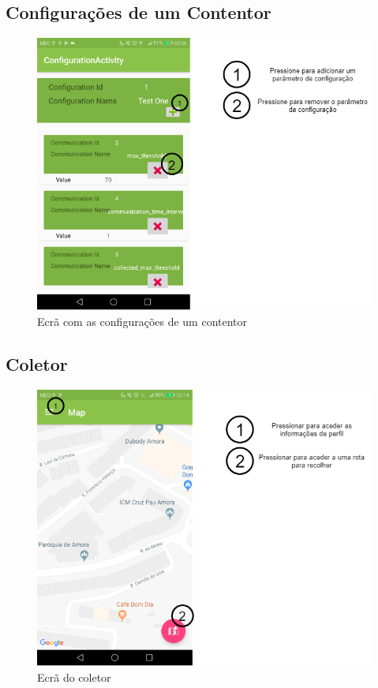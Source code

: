\documentclass[10pt,a5paper]{article}
\begin{document}
\newpage
\subsection{Configurações de um Contentor} 

\begin{figure}[!h]
	\centering
	\includegraphics[width=1.1\textwidth]{Images/screens/container_configuration}
	\caption{Ecrã com as configurações de um contentor}
	\label{fig:container_configuration}
\end{figure}

\newpage
\subsection{Coletor} 

\begin{figure}[!h]
	\centering
	\includegraphics[width=1.1\textwidth]{Images/screens/collector}
	\caption{Ecrã do coletor}
	\label{fig:collector}
\end{figure}
\end{document}

